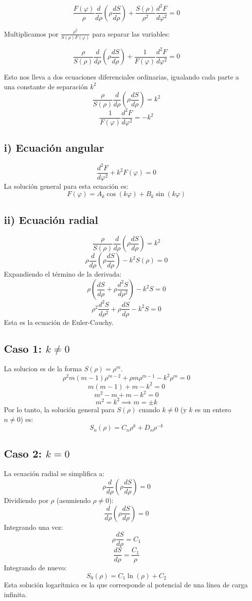 \documentclass[12pt]{article}
\begin{document}
$$ \frac{F(\varphi)}{\rho} \frac{d}{d \rho} \left( \rho \frac{d S}{d \rho} \right) + \frac{S(\rho)}{\rho^2} \frac{d^2 F}{d \varphi^2} = 0 $$

Multiplicamos por $\frac{\rho^2}{S(\rho)F(\varphi)}$ para separar las variables:

$$ \frac{\rho}{S(\rho)} \frac{d}{d \rho} \left( \rho \frac{d S}{d \rho} \right) + \frac{1}{F(\varphi)} \frac{d^2 F}{d \varphi^2} = 0 $$

Esto nos lleva a dos ecuaciones diferenciales ordinarias, igualando cada parte a una constante de separación $k^2$
$$ \frac{\rho}{S(\rho)} \frac{d}{d \rho} \left( \rho \frac{d S}{d \rho} \right) = k^2 $$
$$ \frac{1}{F(\varphi)} \frac{d^2 F}{d \varphi^2} = -k^2 $$

\subsection*{i) Ecuación angular}
$$ \frac{d^2 F}{d \varphi^2} + k^2 F(\varphi) = 0 $$
La solución general para esta ecuación es:
$$ F(\varphi) = A_k \cos(k\varphi) + B_k \sin(k\varphi) $$

\subsection*{ii) Ecuación radial}
$$ \frac{\rho}{S(\rho)} \frac{d}{d \rho} \left( \rho \frac{d S}{d \rho} \right) = k^2 $$
$$ \rho \frac{d}{d \rho} \left( \rho \frac{d S}{d \rho} \right) - k^2 S(\rho) = 0 $$
Expandiendo el término de la derivada:
$$ \rho \left( \frac{dS}{d\rho} + \rho \frac{d^2S}{d\rho^2} \right) - k^2 S = 0 $$
$$ \rho^2 \frac{d^2S}{d\rho^2} + \rho \frac{dS}{d\rho} - k^2 S = 0 $$
Esta es la ecuación de Euler-Cauchy.

\subsection*{Caso 1: $k \neq 0$}
La solucion es de la forma $S(\rho) = \rho^m$. 
$$ \rho^2 m(m-1)\rho^{m-2} + \rho m\rho^{m-1} - k^2 \rho^m = 0 $$
$$ m(m-1) + m - k^2 = 0 $$
$$ m^2 - m + m - k^2 = 0 $$
$$ m^2 = k^2 \implies m = \pm k $$
Por lo tanto, la solución general para $S(\rho)$ cuando $k \neq 0$ (y $k$ es un entero $n \neq 0$) es:
$$ S_n(\rho) = C_n \rho^k + D_n \rho^{-k} $$

\subsection*{Caso 2: $k = 0$}
La ecuación radial se simplifica a:
$$ \rho \frac{d}{d \rho} \left( \rho \frac{d S}{d \rho} \right) = 0 $$
Dividiendo por $\rho$ (asumiendo $\rho \neq 0$):
$$ \frac{d}{d \rho} \left( \rho \frac{d S}{d \rho} \right) = 0 $$
Integrando una vez:
$$ \rho \frac{d S}{d \rho} = C_1 $$
$$ \frac{d S}{d \rho} = \frac{C_1}{\rho} $$
Integrando de nuevo:
$$ S_0(\rho) = C_1 \ln(\rho) + C_2 $$
Esta solución logarítmica es la que corresponde al potencial de una línea de carga infinita.
\end{document}
